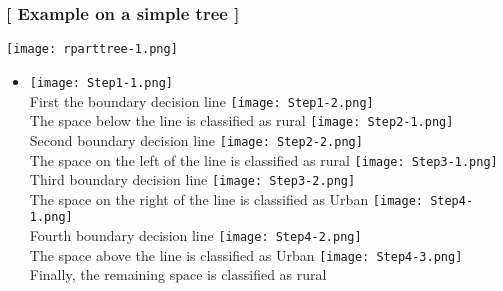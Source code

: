 \documentclass[xcolor=x11names,compress, handhouts]{beamer}
\renewcommand{\(}{\begin{columns}}
\renewcommand{\)}{\end{columns}}
\newcommand{\<}[1]{\begin{column}{#1}}
\renewcommand{\>}{\end{column}}
\begin{document}
\begin{frame} %
\frametitle{\textcolor{brique}{[ Example on a simple tree ]}}
\hfill \texttt{[image: rparttree-1.png]} 
\begin{itemize}
\item[]
   {\texttt{[image: Step1-1.png]} \\ }
   {First the boundary decision line}
   { \texttt{[image: Step1-2.png]} \\ }
   {The space below the line is classified as  rural}
   {\texttt{[image: Step2-1.png]} \\ }
   {Second boundary decision line}
   {\texttt{[image: Step2-2.png]} \\ }
   {The space on the left of the line is classified as  rural}
   {\texttt{[image: Step3-1.png]} \\ }
   {Third boundary decision line}
   {\texttt{[image: Step3-2.png]} \\ }
   {The space on the right of the line is classified as  Urban}
   {\texttt{[image: Step4-1.png]} \\ }
   {Fourth boundary decision line}
   {\texttt{[image: Step4-2.png]} \\ }
   {The space above the line is classified as  Urban}
   {\texttt{[image: Step4-3.png]} \\ }
   {Finally, the remaining space is classified as rural}
\end{itemize}
\end{frame}
\end{document}
